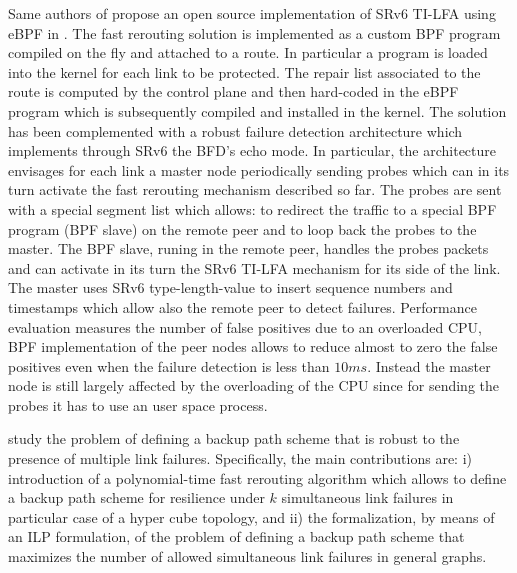 Same authors of \cite{xhonneux2018leveraging} propose an open source implementation of SRv6 TI-LFA using eBPF in \cite{xhonneux2018flexible}. The fast rerouting solution is implemented as a custom BPF program compiled on the fly and attached to a route. In particular a program is loaded into the kernel for each link to be protected. The repair list associated to the route is computed by the control plane and then hard-coded in the eBPF program which is subsequently compiled and installed in the kernel. The solution has been complemented with a robust failure detection architecture which implements through SRv6 the BFD's echo mode. In particular, the architecture envisages for each link a master node periodically sending probes which can in its turn activate the fast rerouting mechanism described so far. 
The probes are sent with a special segment list which allows: to redirect the traffic to a special BPF program (BPF slave) on the remote peer and to loop back the probes to the master. The BPF slave, runing in the remote peer, handles the probes packets and can activate in its turn the SRv6 TI-LFA mechanism for its side of the link. The master uses SRv6 type-length-value to insert sequence numbers and timestamps which allow also the remote peer to detect failures. Performance evaluation measures the number of false positives due to an overloaded CPU, BPF implementation of the peer nodes allows to reduce almost to zero the false positives even when the failure detection is less than $10ms$. Instead the master node is still largely affected by the overloading of the CPU since for sending the probes it has to use an user space process.

\cite{foerster2018local} study the problem of defining a backup path scheme that is robust to the presence of multiple link failures. 
Specifically, the main contributions are: i) introduction of a polynomial-time fast rerouting algorithm which allows to define a backup path scheme for resilience under $k$ simultaneous link failures in particular case of a hyper cube topology, and ii) the formalization, by means of an ILP formulation, of the problem of defining a backup path scheme that maximizes the number of allowed simultaneous link failures in general graphs.

